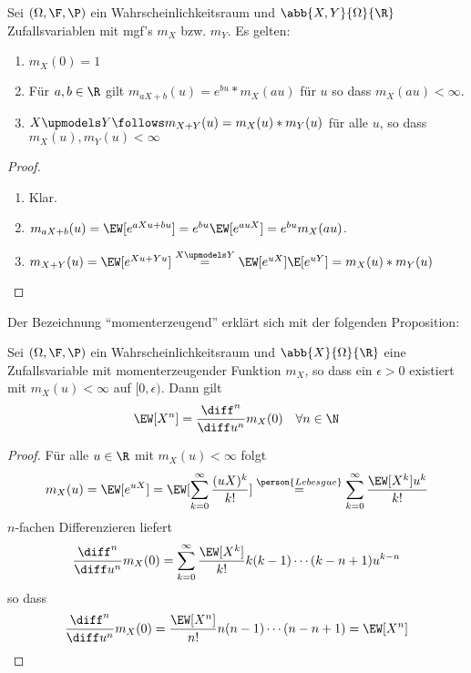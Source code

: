 \begin{proposition}
	\label{8_4_proposition}
	Sei $(\Omega,\F,\P)$ ein Wahrscheinlichkeitsraum und $\abb{X,Y}{\Omega}{\R}$ Zufallsvariablen mit mgf's $m_X$ bzw. $m_Y$. Es gelten:
	\begin{enumerate}[leftmargin=*]
		\item $m_X(0) = 1$
		\item Für $a,b \in \R$ gilt $m_{aX+b}(u) = e^{bu} * m_X(au)$ für $u$ so dass $m_X(au) < \infty$.
		\item $X \upmodels Y \follows m_{X+Y}(u) = m_X(u)* m_Y(u)$ für alle $u$, so dass $m_X(u), m_Y(u) < \infty$ 
	\end{enumerate}
\end{proposition}
\begin{proof}
	\begin{enumerate}[nolistsep, leftmargin=4em, label=(zu \arabic*)]
		\item Klar.
		\item $m_{aX+b}(u) = \EW[e^{aXu + bu}] = e^{bu} \EW[e^{auX}] = e^{bu} m_X(au)$.
		\item $m_{X+Y}(u) = \EW[e^{Xu + Yu}] \overset{X \upmodels Y}{=} \EW[e^{uX}] \E[e^{uY}] = m_X(u) * m_Y(u)$
	\end{enumerate}
\end{proof}


Der Bezeichnung ``momenterzeugend'' erklärt sich mit der folgenden Proposition:
\begin{proposition}
	\label{8_5_proposition}
	Sei $(\Omega,\F,\P)$ ein Wahrscheinlichkeitsraum und $\abb{X}{\Omega}{\R}$ eine Zufallsvariable mit momenterzeugender Funktion $m_X$, so dass ein $\epsilon > 0$ existiert mit $m_X(u)<\infty$ auf $[0,\epsilon)$. Dann gilt
	\begin{equation*}
		\EW[X^n] = \frac{\diff^n}{\diff u^n} m_X(0) \quad \forall n \in \N
	\end{equation*}
\end{proposition}
\begin{proof}
	Für alle $u \in \R$ mit $m_X(u) < \infty$ folgt
	\begin{equation*}
		m_X(u) = \EW[e^{uX}] = \EW[\sum_{k=0}^{\infty}\frac{(uX)^k}{k!}] 		\overset{\person{Lebesgue}}{=} \sum_{k=0}^{\infty} \frac{\EW[X^k]u^k}{k!}
	\end{equation*}
	$n$-fachen Differenzieren liefert
	\begin{equation*}
		\frac{\diff^n}{\diff u^n} m_X(0) = \sum_{k=0}^{\infty} \frac{\EW[X^k]}{k!} k(k-1)\cdots(k-n+1) u^{k-n} \\
	\end{equation*}
	so dass
	\begin{equation*}
		\frac{\diff^n}{\diff u^n} m_X(0) = \frac{\EW[X^n]}{n!} n(n-1)\cdots(n-n+1) = \EW[X^n]
	\end{equation*}
\end{proof}

